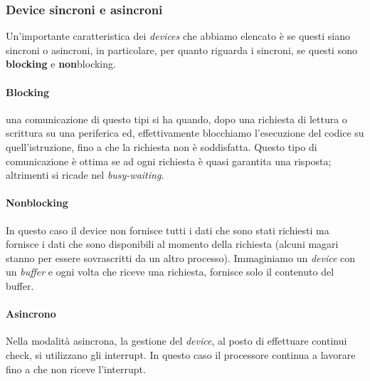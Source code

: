 % 
\subsubsection{Device sincroni e asincroni}
Un'importante caratteristica dei \textit{devices} che abbiamo elencato è se questi siano sincroni o asincroni, in particolare, per quanto riguarda i sincroni, se questi sono \textbf{blocking} e \textbf{non}blocking.

\paragraph{Blocking} una comunicazione di questo tipi si ha quando, dopo una richiesta di lettura o scrittura su una periferica ed, effettivamente blocchiamo l'esecuzione del codice su quell'istruzione, fino a che la richiesta non è soddisfatta. Questo tipo di comunicazione è ottima se ad ogni richiesta è quasi garantita una risposta; altrimenti si ricade nel \textit{busy-waiting}.

\paragraph{Nonblocking} In questo caso il device non fornisce tutti i dati che sono stati richiesti ma fornisce i dati che sono disponibili al momento della richiesta (alcuni magari stanno per essere sovrascritti da un altro processo). Immaginiamo un \textit{device} con un \textit{buffer} e ogni volta che riceve una richiesta, fornisce solo il contenuto del buffer.

\paragraph{Asincrono} Nella modalità asincrona, la gestione del \textit{device}, al posto di effettuare continui check, si utilizzano gli interrupt. In questo caso il processore continua a lavorare fino a che non riceve l'interrupt. 

% 
